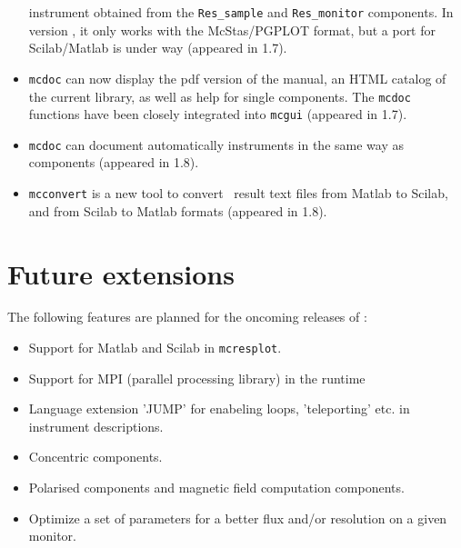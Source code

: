 \begin{itemize}
   instrument obtained from the \verb+Res_sample+ and \verb+Res_monitor+ components.
   In version \version, it only works with the McStas/PGPLOT format, 
   but a port for Scilab/Matlab is under way (appeared in 1.7). 
\item \verb+mcdoc+ can now display the pdf version of the manual, an
  HTML catalog of the current library, as well as help for single
  components.  The \verb+mcdoc+ functions have been
  closely integrated into \verb+mcgui+ (appeared in 1.7). 
\item \verb+mcdoc+ can document automatically instruments in the same way as components
 (appeared in 1.8).
\item \verb+mcconvert+ is a new tool to convert \MCS\ result text files from Matlab to Scilab, 
  and from Scilab to Matlab formats (appeared in 1.8). 
\end{itemize}

\section{Future extensions}
\label{s:future}
The following features are planned for the oncoming releases of \MCS :
\begin{itemize}
\item Support for Matlab and Scilab in \verb+mcresplot+.
\item Support for MPI (parallel processing library) in the runtime
\item Language extension 'JUMP' for enabeling loops, 'teleporting'
  etc. in instrument descriptions.
\item Concentric components.
\item Polarised components and magnetic field computation components.
\item Optimize a set of parameters for a better flux and/or resolution on a given monitor.
\end{itemize}








